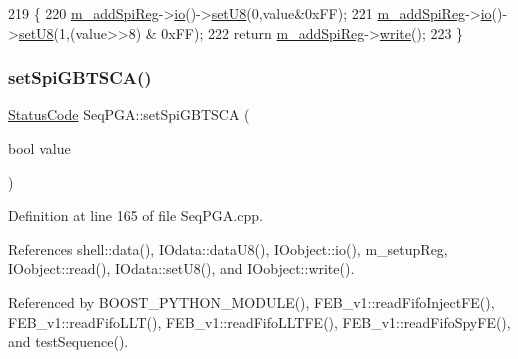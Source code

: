 \begin{DoxyCode}
219                                                      \{
220   \hyperlink{classSeqPGA_af31d87ad56c501584ccb9c60776a1289}{m\_addSpiReg}->\hyperlink{classIOobject_af04fb94137c3d86849f478ac5afab5d1}{io}()->\hyperlink{classIOdata_a6c4fb2f2af01889ada889c2b7aceb24d}{setU8}(0,value&0xFF);
221   \hyperlink{classSeqPGA_af31d87ad56c501584ccb9c60776a1289}{m\_addSpiReg}->\hyperlink{classIOobject_af04fb94137c3d86849f478ac5afab5d1}{io}()->\hyperlink{classIOdata_a6c4fb2f2af01889ada889c2b7aceb24d}{setU8}(1,(value>>8) & 0xFF);
222   \textcolor{keywordflow}{return} \hyperlink{classSeqPGA_af31d87ad56c501584ccb9c60776a1289}{m\_addSpiReg}->\hyperlink{classIOobject_a9f6984bc9f0fadcf800f1be2523ac744}{write}();
223 \}
\end{DoxyCode}
\mbox{\label{classSeqPGA_ae5449d6970bffd8de3670a8a1ce6942d}} 
\subsubsection{\texorpdfstring{set\+Spi\+G\+B\+T\+S\+C\+A()}{setSpiGBTSCA()}}
{\footnotesize\ttfamily \hyperlink{classStatusCode}{Status\+Code} Seq\+P\+G\+A\+::set\+Spi\+G\+B\+T\+S\+CA (\begin{DoxyParamCaption}\item[{bool}]{value }\end{DoxyParamCaption})}



Definition at line 165 of file Seq\+P\+G\+A.\+cpp.



References shell\+::data(), I\+Odata\+::data\+U8(), I\+Oobject\+::io(), m\+\_\+setup\+Reg, I\+Oobject\+::read(), I\+Odata\+::set\+U8(), and I\+Oobject\+::write().



Referenced by B\+O\+O\+S\+T\+\_\+\+P\+Y\+T\+H\+O\+N\+\_\+\+M\+O\+D\+U\+L\+E(), F\+E\+B\+\_\+v1\+::read\+Fifo\+Inject\+F\+E(), F\+E\+B\+\_\+v1\+::read\+Fifo\+L\+L\+T(), F\+E\+B\+\_\+v1\+::read\+Fifo\+L\+L\+T\+F\+E(), F\+E\+B\+\_\+v1\+::read\+Fifo\+Spy\+F\+E(), and test\+Sequence().


